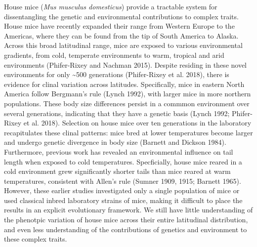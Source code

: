 \documentclass[]{article}
\begin{document}
House mice (\emph{Mus musculus domesticus}) provide a tractable system
for dissentangling the genetic and environmental contributions to
complex traits. House mice have recently expanded their range from
Western Europe to the Americas, where they can be found from the tip of
South America to Alaska. Across this broad latitudinal range, mice are
exposed to various environmental gradients, from cold, temperate
environments to warm, tropical and arid environments (Phifer-Rixey and
Nachman 2015). Despite residing in these novel environments for only
\textasciitilde{}500 generations (Phifer-Rixey et al. 2018), there is
evidence for clinal variation across latitudes. Specifically, mice in
eastern North America follow Bergmann's rule (Lynch 1992), with larger
mice in more northern populations. These body size differences persist
in a commmon environment over several generations, indicating that they
have a genetic basis (Lynch 1992; Phifer-Rixey et al. 2018). Selection
on house mice over ten generations in the laboratory recapitulates these
clinal patterns: mice bred at lower temperatures become larger and
undergo genetic divergence in body size (Barnett and Dickson 1984).
Furthermore, previous work has revealed an environmental influence on
tail length when exposed to cold temperatures. Specficially, house mice
reared in a cold environment grew significantly shorter tails than mice
reared at warm temperatures, consistent with Allen's rule (Sumner 1909,
1915; Barnett 1965). However, these earlier studies investigated only a
single population of mice or used classical inbred laboratory strains of
mice, making it difficult to place the results in an explicit
evolutionary framework. We still have little understanding of the
phenotpic variation of house mice across their entire latitudinal
distribution, and even less understanding of the contributions of
genetics and environment to these complex traits.
\end{document}
